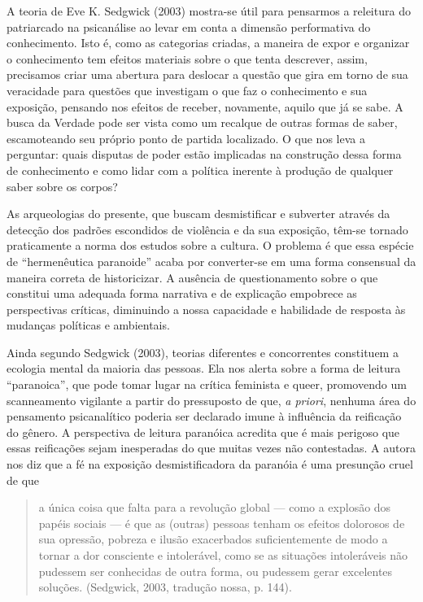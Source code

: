 A teoria de Eve K. Sedgwick (2003) mostra-se útil para pensarmos a
releitura do patriarcado na psicanálise ao levar em conta a dimensão
performativa do conhecimento. Isto é, como as categorias criadas, a
maneira de expor e organizar o conhecimento tem efeitos materiais sobre
o que tenta descrever, assim, precisamos criar uma abertura para
deslocar a questão que gira em torno de sua veracidade para questões que
investigam o que faz o conhecimento e sua exposição, pensando nos
efeitos de receber, novamente, aquilo que já se sabe. A busca da Verdade
pode ser vista como um recalque de outras formas de saber, escamoteando
seu próprio ponto de partida localizado. O que nos leva a perguntar:
quais disputas de poder estão implicadas na construção dessa forma de
conhecimento e como lidar com a política inerente à produção de qualquer
saber sobre os corpos?

As arqueologias do presente, que buscam desmistificar e subverter
através da detecção dos padrões escondidos de violência e da sua
exposição, têm-se tornado praticamente a norma dos estudos sobre a
cultura. O problema é que essa espécie de ``hermenêutica paranoide''
acaba por converter-se em uma forma consensual da maneira correta de
historicizar. A ausência de questionamento sobre o que constitui uma
adequada forma narrativa e de explicação empobrece as perspectivas
críticas, diminuindo a nossa capacidade e habilidade de resposta às
mudanças políticas e ambientais.

Ainda segundo Sedgwick (2003), teorias diferentes e concorrentes
constituem a ecologia mental da maioria das pessoas. Ela nos alerta
sobre a forma de leitura ``paranoica'', que pode tomar lugar na crítica
feminista e queer, promovendo um scanneamento vigilante a partir do
pressuposto de que, \emph{a priori}, nenhuma área do pensamento
psicanalítico poderia ser declarado imune à influência da reificação do
gênero. A perspectiva de leitura paranóica acredita que é mais perigoso
que essas reificações sejam inesperadas do que muitas vezes não
contestadas. A autora nos diz que a fé na exposição desmistificadora da
paranóia é uma presunção cruel de que

\begin{quote}
a única coisa que falta para a revolução global --- como a explosão dos
papéis sociais --- é que as (outras) pessoas tenham os efeitos dolorosos
de sua opressão, pobreza e ilusão exacerbados suficientemente de modo a
tornar a dor consciente e intolerável, como se as situações intoleráveis
não pudessem ser conhecidas de outra forma, ou pudessem gerar excelentes
soluções. (Sedgwick, 2003, tradução nossa, p. 144).
\end{quote}

